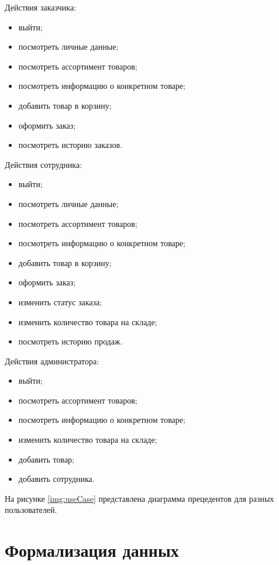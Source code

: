 Действия заказчика:
\begin{itemize}
	\item выйти;
	\item посмотреть личные данные;
	\item посмотреть ассортимент товаров;
	\item посмотреть информацию о конкретном товаре;
	\item добавить товар в корзину;
	\item оформить заказ;
	\item посмотреть историю заказов.
\end{itemize}

Действия сотрудника:
\begin{itemize}
	\item выйти;
	\item посмотреть личные данные;
	\item посмотреть ассортимент товаров;
	\item посмотреть информацию о конкретном товаре;
	\item добавить товар в корзину;
	\item оформить заказ;
	\item изменить статус заказа;
	\item изменить количество товара на складе;	
	\item посмотреть историю продаж.
\end{itemize}

Действия администратора:
\begin{itemize}
	\item выйти;
	\item посмотреть ассортимент товаров;
	\item посмотреть информацию о конкретном товаре;
	\item изменить количество товара на складе;	
	\item добавить товар;
	\item добавить сотрудника.
\end{itemize}

\clearpage
На рисунке \ref{img:useCase} представлена диаграмма прецедентов для разных пользователей.



\section{Формализация данных}

